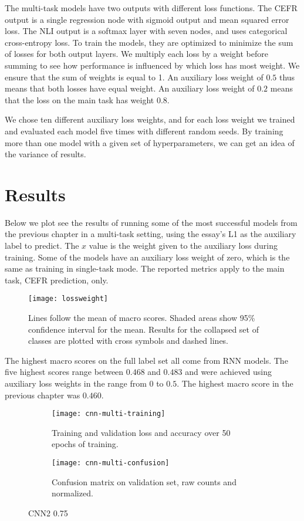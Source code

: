 The multi-task models have two outputs with different loss functions. The
CEFR output is a single regression node with sigmoid output and mean squared
error loss. The NLI output is a softmax layer with seven nodes, and uses
categorical cross-entropy loss. To train the models, they are optimized to
minimize the sum of losses for both output layers. We multiply each loss by a
weight before summing to see how performance is influenced by which loss has
most weight. We ensure that the sum of weights is equal to 1. An auxiliary
loss weight of $0.5$ thus means that both losses have equal weight. An
auxiliary loss weight of $0.2$ means that the loss on the main task has
weight $0.8$.

We chose ten different auxiliary loss weights, and for each loss weight we
trained and evaluated each model five times with different random seeds. By
training more than one model with a given set of hyperparameters, we can get
an idea of the variance of results.

\section{Results}

Below we plot see the results of running some of the most successful models
from the previous chapter in a multi-task setting, using the essay's L1 as
the auxiliary label to predict. The $x$ value is the weight given to the
auxiliary loss during training. Some of the models have an auxiliary loss
weight of zero, which is the same as training in single-task mode.
The reported metrics apply to the main task, CEFR prediction, only.

\begin{figure}
  \centering
  \texttt{[image: lossweight]}
  \caption[Performance of multi-task models]{
    Lines follow the mean of macro \FI scores. Shaded areas show 95\% confidence
    interval for the mean. Results for the collapsed set of classes are plotted with
    cross symbols and dashed lines.
  }
  \label{fig:lossweight}
\end{figure}

The highest macro \FI scores on the full label set all come from RNN models.
The five highest scores range between $0.468$ and $0.483$ and were achieved
using auxiliary loss weights in the range from $0$ to $0.5$.
The highest macro \FI score in the previous chapter was $0.460$.


\begin{figure}
  \begin{subfigure}{\linewidth}
    \centering
    \texttt{[image: cnn-multi-training]}
    \caption{Training and validation loss and accuracy over 50 epochs of training.}
  \end{subfigure}
  \begin{subfigure}{\linewidth}
    \centering
    \texttt{[image: cnn-multi-confusion]}
    \caption{Confusion matrix on validation set, raw counts and normalized.}
  \end{subfigure}
  \caption{CNN2 0.75}
  \label{fig:cnn-multi-training}
\end{figure}


